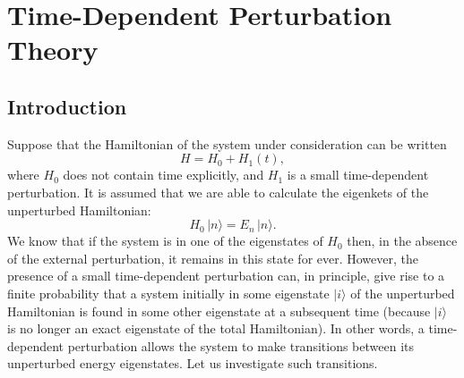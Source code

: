\chapter{Time-Dependent Perturbation Theory}

\section{Introduction}
Suppose that the Hamiltonian of the  system under consideration 
can be written
\begin{equation}
H = H_0 + H_1(t),
\end{equation}
where $H_0$ does not contain time explicitly, and $H_1$ is a small
time-dependent perturbation. It is assumed that we are able to calculate
the eigenkets of the unperturbed Hamiltonian:
\begin{equation}
H_0 \,|n\rangle = E_n \,|n\rangle.
\end{equation}
We know that if the system is in one of the
eigenstates of $H_0$ then, in the absence of the external
perturbation,  it remains in this state for ever. However,
the presence of a small time-dependent perturbation can, in principle, 
give rise to a finite probability that a system initially in some
eigenstate $|i\rangle$ of the unperturbed Hamiltonian
is  found in some other eigenstate at a subsequent time (because
$|i\rangle$ is no longer  an exact  eigenstate of the total
 Hamiltonian).
 In other words,
a time-dependent perturbation  allows 
the system to make transitions between
its unperturbed energy eigenstates. Let us investigate such transitions. 

